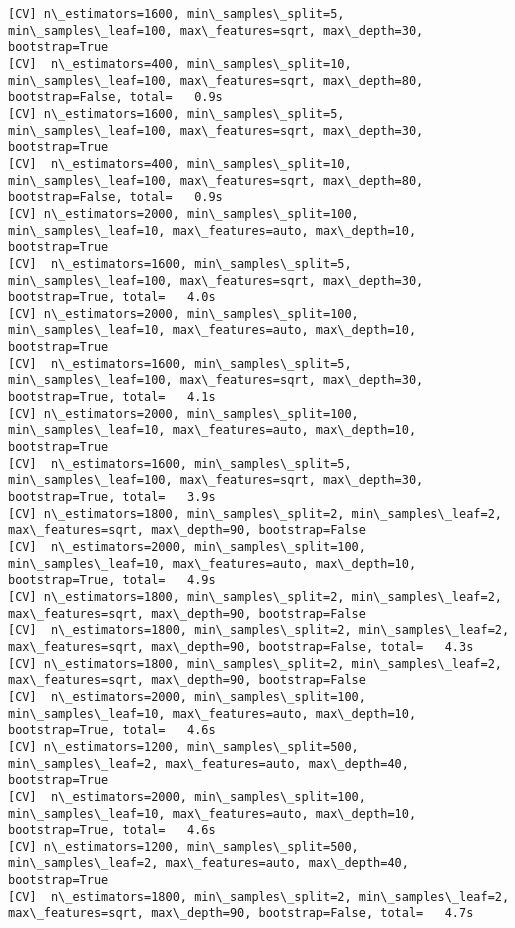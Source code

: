 \documentclass[11pt]{article}
\begin{document}
\begin{Verbatim}[commandchars=\\\{\}]
[CV] n\_estimators=1600, min\_samples\_split=5, min\_samples\_leaf=100, max\_features=sqrt, max\_depth=30, bootstrap=True 
[CV]  n\_estimators=400, min\_samples\_split=10, min\_samples\_leaf=100, max\_features=sqrt, max\_depth=80, bootstrap=False, total=   0.9s
[CV] n\_estimators=1600, min\_samples\_split=5, min\_samples\_leaf=100, max\_features=sqrt, max\_depth=30, bootstrap=True 
[CV]  n\_estimators=400, min\_samples\_split=10, min\_samples\_leaf=100, max\_features=sqrt, max\_depth=80, bootstrap=False, total=   0.9s
[CV] n\_estimators=2000, min\_samples\_split=100, min\_samples\_leaf=10, max\_features=auto, max\_depth=10, bootstrap=True 
[CV]  n\_estimators=1600, min\_samples\_split=5, min\_samples\_leaf=100, max\_features=sqrt, max\_depth=30, bootstrap=True, total=   4.0s
[CV] n\_estimators=2000, min\_samples\_split=100, min\_samples\_leaf=10, max\_features=auto, max\_depth=10, bootstrap=True 
[CV]  n\_estimators=1600, min\_samples\_split=5, min\_samples\_leaf=100, max\_features=sqrt, max\_depth=30, bootstrap=True, total=   4.1s
[CV] n\_estimators=2000, min\_samples\_split=100, min\_samples\_leaf=10, max\_features=auto, max\_depth=10, bootstrap=True 
[CV]  n\_estimators=1600, min\_samples\_split=5, min\_samples\_leaf=100, max\_features=sqrt, max\_depth=30, bootstrap=True, total=   3.9s
[CV] n\_estimators=1800, min\_samples\_split=2, min\_samples\_leaf=2, max\_features=sqrt, max\_depth=90, bootstrap=False 
[CV]  n\_estimators=2000, min\_samples\_split=100, min\_samples\_leaf=10, max\_features=auto, max\_depth=10, bootstrap=True, total=   4.9s
[CV] n\_estimators=1800, min\_samples\_split=2, min\_samples\_leaf=2, max\_features=sqrt, max\_depth=90, bootstrap=False 
[CV]  n\_estimators=1800, min\_samples\_split=2, min\_samples\_leaf=2, max\_features=sqrt, max\_depth=90, bootstrap=False, total=   4.3s
[CV] n\_estimators=1800, min\_samples\_split=2, min\_samples\_leaf=2, max\_features=sqrt, max\_depth=90, bootstrap=False 
[CV]  n\_estimators=2000, min\_samples\_split=100, min\_samples\_leaf=10, max\_features=auto, max\_depth=10, bootstrap=True, total=   4.6s
[CV] n\_estimators=1200, min\_samples\_split=500, min\_samples\_leaf=2, max\_features=auto, max\_depth=40, bootstrap=True 
[CV]  n\_estimators=2000, min\_samples\_split=100, min\_samples\_leaf=10, max\_features=auto, max\_depth=10, bootstrap=True, total=   4.6s
[CV] n\_estimators=1200, min\_samples\_split=500, min\_samples\_leaf=2, max\_features=auto, max\_depth=40, bootstrap=True 
[CV]  n\_estimators=1800, min\_samples\_split=2, min\_samples\_leaf=2, max\_features=sqrt, max\_depth=90, bootstrap=False, total=   4.7s

\end{Verbatim}
\end{document}
